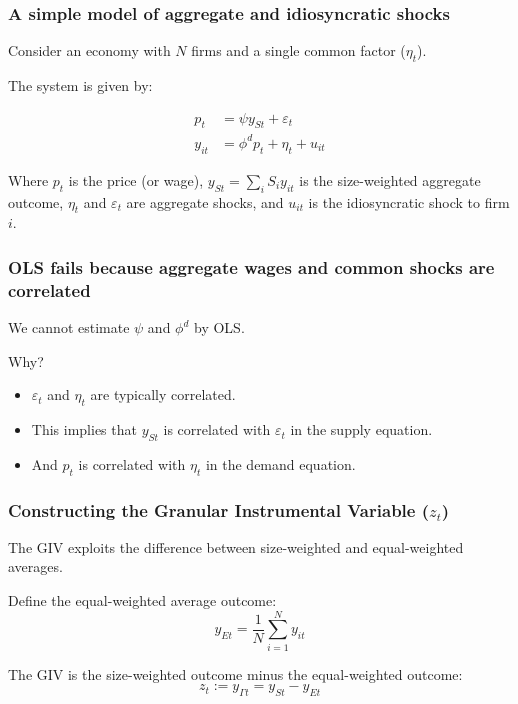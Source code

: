 \documentclass[aspectratio=169,11pt]{beamer}
\begin{document}
\begin{frame}
\frametitle{A simple model of aggregate and idiosyncratic shocks}

Consider an economy with $N$ firms and a single common factor ($\eta_t$).

\vspace{0.8cm}
The system is given by:

\vspace{0.5cm}
\begin{align}
p_t &= \psi y_{St} + \varepsilon_t \tag{38} \\[0.5cm]
y_{it} &= \phi^d p_t + \eta_t + u_{it} \tag{39}
\end{align}

\vspace{0.8cm}
Where $p_t$ is the price (or wage), $y_{St} = \sum_i S_i y_{it}$ is the size-weighted aggregate outcome, $\eta_t$ and $\varepsilon_t$ are aggregate shocks, and $u_{it}$ is the idiosyncratic shock to firm $i$.

\end{frame}

\begin{frame}
\frametitle{OLS fails because aggregate wages and common shocks are correlated}

\vspace{0.5cm}
{\Large
We cannot estimate $\psi$ and $\phi^d$ by OLS.
}

\vspace{1cm}
{\Large
Why?
}

\vspace{0.5cm}
\begin{itemize}
    \item $\varepsilon_t$ and $\eta_t$ are typically correlated.
    \item This implies that $y_{St}$ is correlated with $\varepsilon_t$ in the supply equation.
    \item And $p_t$ is correlated with $\eta_t$ in the demand equation.
\end{itemize}

\end{frame}

\begin{frame}
\frametitle{Constructing the Granular Instrumental Variable ($z_t$)}

\vspace{0.5cm}
{\Large
The GIV exploits the difference between size-weighted and equal-weighted averages.
}

\vspace{1cm}
Define the equal-weighted average outcome:
\begin{equation*}
y_{Et} = \frac{1}{N} \sum_{i=1}^N y_{it}
\end{equation*}

\vspace{0.5cm}
The GIV is the size-weighted outcome minus the equal-weighted outcome:
\begin{equation}
z_t := y_{\Gamma t} = y_{St} - y_{Et} \tag{40}
\end{equation}

\end{frame}
\end{document}
